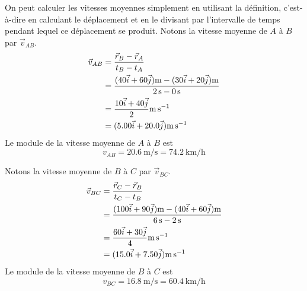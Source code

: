 {  On peut calculer les vitesses moyennes simplement en utilisant la définition,
  c'est-à-dire en calculant le déplacement et en le divisant par l'intervalle
  de temps pendant lequel ce déplacement se produit.  Notons la vitesse moyenne
  de $A$ à $B$ par $\vec{v}_{AB}$.
  \begin{align*}
    \vec{v}_{AB} &= \frac{\vec{r}_B - \vec{r}_A}{t_B - t_A} \\
                 &= \frac{(40\xhat + 60\yhat)\si{m} - (30\xhat + 20
                   \yhat)\si{m}}{\SI{2}{\second} - \SI{0}{\second}} \\
                 &= \frac{10\xhat + 40\yhat}{2} \si{\meter\per\second} \\
                 &= (\num{5.00}\xhat + \num{20.0}\yhat) \si{\meter\per\second}
  \end{align*}
  Le module de la vitesse moyenne de $A$ à $B$ est
  \[
    v_{AB} = \SI{20.6}{\meter\per\second} = \SI{74.2}{\kilo\meter\per\hour}
  \]

  Notons la vitesse moyenne de $B$ à $C$ par $\vec{v}_{BC}$.
  \begin{align*}
    \vec{v}_{BC} &= \frac{\vec{r}_C - \vec{r}_B}{t_C - t_B} \\
                 &= \frac{(100\xhat + 90\yhat)\si{m} - (40\xhat + 60
                   \yhat)\si{m}}{\SI{6}{\second} - \SI{2}{\second}} \\
                 &= \frac{60\xhat + 30\yhat}{4} \si{\meter\per\second} \\
                 &= (\num{15.0}\xhat + \num{7.50}\yhat) \si{\meter\per\second}
  \end{align*}
  Le module de la vitesse moyenne de $B$ à $C$ est
  \[
    v_{BC} = \SI{16.8}{\meter\per\second} = \SI{60.4}{\kilo\meter\per\hour}
  \]

}
